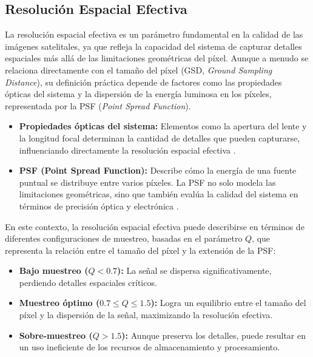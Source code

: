     \subsection{Resolución Espacial Efectiva}

        La resolución espacial efectiva es un parámetro fundamental en la calidad de las imágenes satelitales, ya que refleja la capacidad del sistema de capturar detalles espaciales más allá de las limitaciones geométricas del píxel. Aunque a menudo se relaciona directamente con el tamaño del píxel (GSD, \textit{Ground Sampling Distance}), su definición práctica depende de factores como las propiedades ópticas del sistema y la dispersión de la energía luminosa en los píxeles, representada por la PSF (\textit{Point Spread Function}).
        
        \begin{itemize}
            \item \textbf{Propiedades ópticas del sistema:} Elementos como la apertura del lente y la longitud focal determinan la cantidad de detalles que pueden capturarse, influenciando directamente la resolución espacial efectiva \autocite{valenzuela2022new}.
            \item \textbf{PSF (Point Spread Function):} Describe cómo la energía de una fuente puntual se distribuye entre varios píxeles. La PSF no solo modela las limitaciones geométricas, sino que también evalúa la calidad del sistema en términos de precisión óptica y electrónica \autocite{pampanoni2024analysing}.
        \end{itemize}
        
        En este contexto, la resolución espacial efectiva puede describirse en términos de diferentes configuraciones de muestreo, basadas en el parámetro \( Q \), que representa la relación entre el tamaño del píxel y la extensión de la PSF:
        
        \begin{itemize}
            \item \textbf{Bajo muestreo (\( Q < 0.7 \)):} La señal se dispersa significativamente, perdiendo detalles espaciales críticos.
            \item \textbf{Muestreo óptimo (\( 0.7 \leq Q \leq 1.5 \)):} Logra un equilibrio entre el tamaño del píxel y la dispersión de la señal, maximizando la resolución efectiva.
            \item \textbf{Sobre-muestreo (\( Q > 1.5 \)):} Aunque preserva los detalles, puede resultar en un uso ineficiente de los recursos de almacenamiento y procesamiento.
        \end{itemize}

